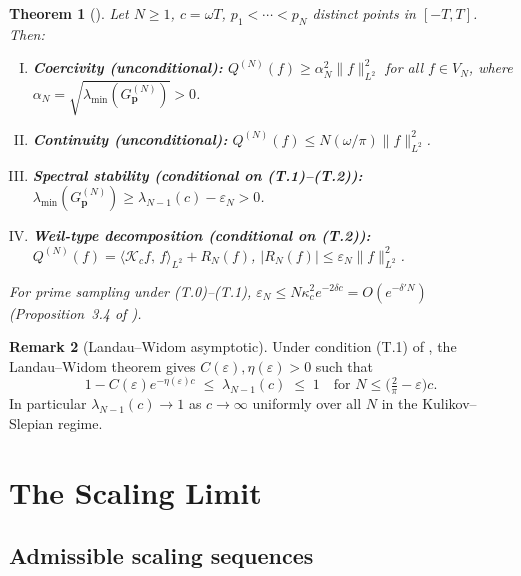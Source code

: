 \documentclass[12pt,a4paper]{amsart}
\newtheorem{theorem}{Theorem}[section]
\theoremstyle{definition}
\newtheorem{remark}[theorem]{Remark}
\newcommand{\Kop}{\mathcal{K}_c}
\newcommand{\Kul}{\kappa_c}
\newcommand{\GVM}{G^{(N)}_{\mathbf{p}}}
\newcommand{\norm}[1]{\|#1\|}
\newcommand{\ip}[2]{\langle #1,\, #2\rangle}
\begin{document}
\begin{theorem}[{\cite[Thm.~1]{PaperI}}]\label{thm:paperI}
Let $N\geq1$, $c=\omega T$, $p_1<\cdots<p_N$ distinct points
in $[-T,T]$. Then:
\begin{enumerate}[(I)]
\item \textbf{Coercivity (unconditional):}
$Q^{(N)}(f)\geq\alpha_N^2\norm{f}_{L^2}^2$ for all $f\in V_N$,
where $\alpha_N=\sqrt{\lambda_{\min}(\GVM)}>0$.
\item \textbf{Continuity (unconditional):}
$Q^{(N)}(f)\leq N(\omega/\pi)\norm{f}_{L^2}^2$.
\item \textbf{Spectral stability (conditional on (T.1)--(T.2)):}
$\lambda_{\min}(\GVM)\geq\lambda_{N-1}(c)-\varepsilon_N>0$.
\item \textbf{Weil-type decomposition (conditional on (T.2)):}
$Q^{(N)}(f)=\ip{\Kop f}{f}_{L^2}+R_N(f)$,
$|R_N(f)|\leq\varepsilon_N\norm{f}_{L^2}^2$.
\end{enumerate}
For prime sampling under (T.0)--(T.1),
$\varepsilon_N\leq N\Kul^2 e^{-2\delta c}=O(e^{-\delta'N})$
\textup{(Proposition~3.4 of \cite{PaperI})}.
\end{theorem}

\begin{remark}[Landau--Widom asymptotic]\label{rem:LW}
Under condition (T.1) of \cite{PaperI},
the Landau--Widom theorem \cite{Slepian1978} gives
$C(\varepsilon),\eta(\varepsilon)>0$ such that
\[
  1-C(\varepsilon)e^{-\eta(\varepsilon)c}
  \;\leq\;\lambda_{N-1}(c)\;\leq\;1
  \quad\text{for }N\leq\bigl(\tfrac{2}{\pi}-\varepsilon\bigr)c.
\]
In particular $\lambda_{N-1}(c)\to1$ as $c\to\infty$ uniformly
over all $N$ in the Kulikov--Slepian regime.
\end{remark}

\section{The Scaling Limit}\label{sec:scaling}

\subsection{Admissible scaling sequences}
\end{document}
